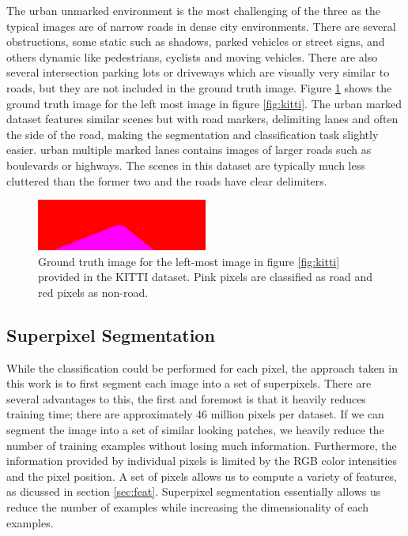 \documentclass{article} %
\begin{document}
The urban unmarked environment is the most challenging of the three as the typical images are of narrow roads in dense city environments. There are several obstructions, some static such as shadows, parked vehicles or street signs, and others dynamic like pedestrians, cyclists and moving vehicles. There are also several intersection parking lots or driveways which are visually very similar to roads, but they are not included in the ground truth image. Figure \ref{fig:gt} shows the ground truth image for the left most image in figure \ref{fig:kitti}. The urban marked dataset features similar scenes but with road markers, delimiting lanes and often the side of the road, making the segmentation and classification task slightly easier. urban multiple marked lanes contains images of larger roads such as boulevards or highways. The scenes in this dataset are typically much less cluttered than the former two and the roads have clear delimiters.

\begin{figure}[ht!]
 \centering
 \includegraphics[width=0.5\textwidth]{figs/gt_example_uu.png}
 \caption{Ground truth image for the left-most image in figure \ref{fig:kitti} provided in the KITTI dataset. Pink pixels are classified as road and red pixels as non-road.}\label{fig:gt}
\end{figure}

\subsection{Superpixel Segmentation}
While the classification could be performed for each pixel, the approach taken in this work is to first segment each image into a set of superpixels. There are several advantages to this, the first and foremost is that it heavily reduces training time; there are approximately 46 million pixels per dataset. If we can segment the image into a set of similar looking patches, we heavily reduce the number of training examples without losing much information. Furthermore, the information provided by individual pixels is limited by the RGB color intensities and the pixel position. A set of pixels allows us to compute a variety of features, as dicussed in section \ref{sec:feat}. Superpixel segmentation essentially allows us reduce the number of examples while increasing the dimensionality of each examples.
\end{document}
